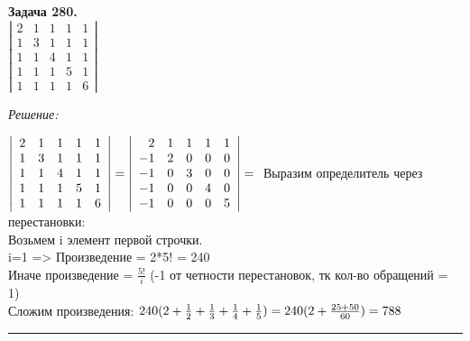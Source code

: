 \documentclass[a4paper, 12pt]{article}
\newenvironment{problem}[2][Задача]
    { \begin{mdframed}[backgroundcolor=gray!10] \textbf{#1 #2.} \\}
    {  \end{mdframed}}
\newenvironment{solution}
    {\textit{Решение: }}
    {\noindent\rule{7in}{1.5pt}}
\begin{document}
\begin{problem}{280}
$\left| \begin{array}{rrrrr}2 & 1 & 1 & 1 & 1 \\ 1 & 3 & 1 & 1 & 1 \\ 1 & 1 & 4 & 1 & 1 \\ 1 & 1 & 1 & 5 & 1 \\ 1 & 1 & 1 & 1 & 6 \end{array} \right|$
\end{problem}
\begin{solution}

$
\left|
\begin{array}{rrrrr}
2 & 1 & 1 & 1 & 1 \\
1 & 3 & 1 & 1 & 1 \\
1 & 1 & 4 & 1 & 1 \\
1 & 1 & 1 & 5 & 1 \\
1 & 1 & 1 & 1 & 6
\end{array}
\right|
=
\left|
\begin{array}{rrrrr}
2 & 1 & 1 & 1 & 1 \\
-1 & 2 & 0 & 0 & 0 \\
-1 & 0 & 3 & 0 & 0 \\
-1 & 0 & 0 & 4 & 0 \\
-1 & 0 & 0 & 0 & 5
\end{array}
\right|
= \\
$
Выразим определитель через перестановки: \\
Возьмем i элемент первой строчки. \\
i=1 => Произведение = 2*5! = 240 \\
Иначе произведение = $\frac{5!}{i}$ (-1 от четности перестановок, тк кол-во обращений = 1) \\
Сложим произведения:
$
240(2 + \frac{1}{2} + \frac{1}{3} + \frac{1}{4} + \frac{1}{5}) =
240(2 + \frac{25 + 50}{60}) = 788\\
$ \\

\end{solution}
\end{document}
